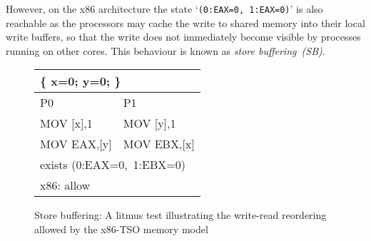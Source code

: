 However, on the x86 architecture the state `\texttt{(0:EAX=0,\,1:EAX=0)}' is also reachable as the processors may cache the write to shared memory into their local write buffers, so that the write does not immediately become visible by processes running on other cores.
This behaviour is known as \textit{store buffering~(SB)}.

\begin{figure}[t]
\centering
\ttfamily
\begin{tabular}{ |l|l| }
\hline
\multicolumn{2}{|l|}{ \{ x=0; y=0; \}} \tabularnewline \hline
P0 & P1 \\ \hline
MOV [x],1 & MOV [y],1 \\
MOV EAX,[y] & MOV EBX,[x] \\
\hline
\multicolumn{2}{|l|}{exists (0:EAX=0,~1:EBX=0)} \tabularnewline
\hline
\multicolumn{2}{|l|}{x86: allow} \tabularnewline
\hline
\end{tabular}
\caption{Store buffering: A litmus test illustrating the write-read reordering allowed by the x86-TSO memory model}
\label{simple_wmm_x86}
\end{figure}


